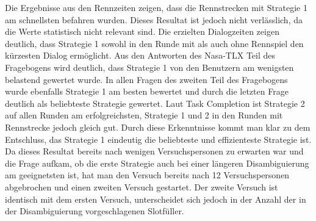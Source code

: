 \documentclass[12pt,a4paper]{scrartcl}
\begin{document}
Die Ergebnisse aus den Rennzeiten zeigen, dass die Rennstrecken mit Strategie 1 am schnellsten befahren wurden. Dieses Resultat ist jedoch nicht verlässlich, da die Werte statistisch nicht relevant sind.
Die erzielten Dialogzeiten zeigen deutlich, dass Strategie 1 sowohl in den Runde mit als auch ohne Rennspiel den kürzesten Dialog ermöglicht. Aus den Antworten des Nasa-TLX Teil des Fragebogens wird deutlich, dass Strategie 1 von den Benutzern am wenigsten belastend gewertet wurde.  In allen Fragen des zweiten Teil des Fragebogens wurde ebenfalls Strategie 1 am besten bewertet und durch die letzten Frage deutlich als beliebteste Strategie gewertet. Laut Task Completion ist Strategie 2 auf allen Runden am erfolgreichsten, Strategie 1 und 2 in den Runden mit Rennstrecke jedoch gleich gut.
Durch diese Erkenntnisse kommt man klar zu dem Entschluss, das Strategie 1 eindeutig die beliebteste und effizienteste Strategie ist. \newline \newline
Da dieses Resultat bereits nach wenigen Versuchspersonen zu erwarten war und die Frage aufkam, ob die erste Strategie auch bei einer längeren Disambiguierung am geeignetsten ist, hat man den Versuch bereits nach 12 Versuchspersonen abgebrochen und einen zweiten Versuch gestartet. Der zweite Versuch ist identisch mit dem ersten Versuch, unterscheidet sich jedoch in der Anzahl der in der Disambiguierung vorgeschlagenen Slotfüller. 
\end{document}
